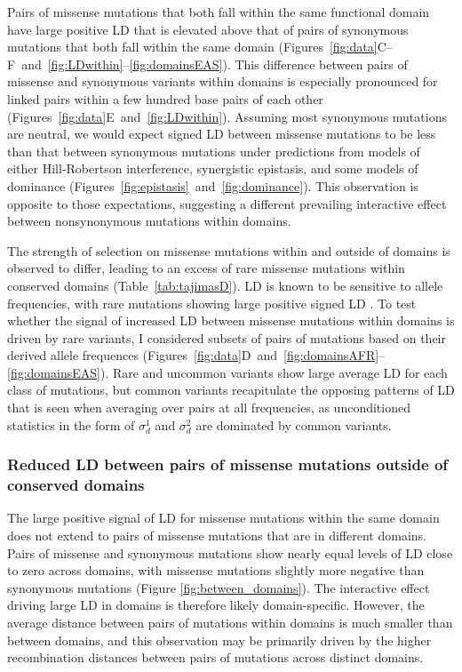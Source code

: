 \documentclass[]{article}
\begin{document}
Pairs of missense mutations that both fall within the same functional domain
have large positive LD that is elevated above that of pairs of synonymous
mutations that both fall within the same domain
(Figures~\ref{fig:data}C--F~and~\ref{fig:LDwithin}--\ref{fig:domainsEAS}). This
difference between pairs of missense and synonymous variants within domains is
especially pronounced for linked pairs within a few hundred base pairs of each
other (Figures~\ref{fig:data}E~and~\ref{fig:LDwithin}). Assuming most
synonymous mutations are neutral, we would expect signed LD between missense
mutations to be less than that between synonymous mutations under predictions
from models of either Hill-Robertson interference, synergistic epistasis, and
some models of dominance (Figures~\ref{fig:epistasis}~and~\ref{fig:dominance}).
This observation is opposite to those expectations, suggesting a different
prevailing interactive effect between nonsynonymous mutations within domains.

The strength of selection on missense mutations within and outside of domains
is observed to differ, leading to an excess of rare missense mutations within
conserved domains (Table~\ref{tab:tajimasD}). LD is known to be sensitive to
allele frequencies, with rare mutations showing large positive signed LD
\citep{Good2022-ot}. To test whether the signal of increased LD between
missense mutations within domains is driven by rare variants, I considered
subsets of pairs of mutations based on their derived allele frequences
(Figures~\ref{fig:data}D~and~\ref{fig:domainsAFR}--\ref{fig:domainsEAS}). Rare
and uncommon variants show large average LD for each class of mutations, but
common variants recapitulate the opposing patterns of LD that is seen when
averaging over pairs at all frequencies, as unconditioned statistics in the
form of \(\sigma_d^1\) and \(\sigma_d^2\) are dominated by common variants.

\subsubsection{Reduced LD between pairs of missense mutations outside of conserved domains}

The large positive signal of LD for missense mutations within the same domain
does not extend to pairs of missense mutations that are in different domains.
Pairs of missense and synonymous mutations show nearly equal levels of LD close
to zero across domains, with missense mutations slightly more negative than
synonymous mutations (Figure \ref{fig:between_domains}). The interactive effect
driving large LD in domains is therefore likely domain-specific. However, the
average distance between pairs of mutations within domains is much smaller than
between domains, and this observation may be primarily driven by the higher
recombination distances between pairs of mutations across distinct domains.
\end{document}
